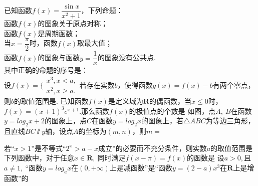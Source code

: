 \documentclass[marginline,noindent,answers,adobefonts]{BHCexam}
\begin{document}
\begin{questions}
\qs 已知函数$f(x)=\dfrac{ \sin x}{x^2+1 }$，下列命题：\\
 函数$f(x)$的图象关于原点对称；\\
 函数$f(x)$是周期函数；\\
 当$ x=\dfrac{\pi}{2} $时，函数$f(x)$取最大值；\\
 函数$f(x)$的图象与函数$ y=\dfrac{1}{x} $的图象没有公共点.\\
其中正确的命题的序号是：\\
\qs 设$ f(x)=\Bigg\{\begin{aligned}
x^3,x<a,\\x^2,x\ge a.
\end{aligned} $若存在实数$ b $，使得函数$ g(x)=f(x)-b $有两个零点，则$ b $的取值范围是\tk. 
\qs 已知函数$f(x)$是定义域为$ \mathbf{R} $的偶函数，当$ x\le 0 $时，$ f(x)=(x+1)^3e^{x+1} .$那么函数$ f(x) $的极值点的个数是\xx
{}
\qs 如图，点$A,~B$在函数$ y=log_2x+2 $的图象上，点$C$在函数$y=log_2x$的图象上，若$ \triangle ABC$为等边三角形，且直线$ BC\sslash y$轴，设点$A$的坐标为$ (m,n) $，则$ m= $\xx
\vspace{-1em}
\begin{center}
\end{center}
\vspace{-2em}
 \qs 若“$x>1$”是不等式“$2^x>a-x$成立”的必要而不充分条件，则实数$ a $的取值范围是\xx
{}
\qs 下列函数中，对于任意$ x\in \mathbf{R} ,~$同时满足$f(x-\pi)=f(x)$的函数是\xx
{}
\qs 设$ a>0, $且$ a\ne 1,~ $“函数$y=log_ax$在$ \left(0,+\infty\right) $上是减函数”是“函数$ y=(2-a)x^3 $在$ \mathbf{R} $上是增函数”的\xx

\end{questions}
\end{document}
